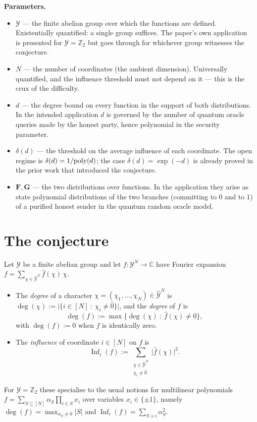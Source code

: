 \documentclass{aicr-conjecture}
\newcommand{\CC}{\mathbb{C}}
\newcommand{\ZZ}{\mathbb{Z}}
\newcommand{\cY}{\mathcal{Y}}
\newcommand{\dY}{\widehat{\mathcal{Y}}}
\newcommand{\bF}{\mathbf{F}}
\newcommand{\bG}{\mathbf{G}}
\begin{document}
\textbf{Parameters.}
\begin{itemize}
  \item $\cY$ --- the finite abelian group over which the functions are
  defined. Existentially quantified: a single group suffices. The paper's
  own application is presented for $\cY=\ZZ_2$ but goes through for
  whichever group witnesses the conjecture.
  \item $N$ --- the number of coordinates (the ambient dimension).
  Universally quantified, and the influence threshold must not depend on
  it --- this is the crux of the difficulty.
  \item $d$ --- the degree bound on every function in the support of both
  distributions. In the intended application $d$ is governed by the
  number of quantum oracle queries made by the honest party, hence
  polynomial in the security parameter.
  \item $\delta(d)$ --- the threshold on the average influence of each
  coordinate. The open regime is $\delta(d)=1/\mathrm{poly}(d)$; the case
  $\delta(d)=\exp(-d)$ is already proved in the prior work that
  introduced the conjecture.
  \item $\bF,\bG$ --- the two distributions over functions. In the
  application they arise as state polynomial distributions of the two
  branches (committing to $0$ and to $1$) of a purified honest sender in
  the quantum random oracle model.
\end{itemize}

\section{The conjecture}\label{sec:conjectures}

\begin{definition}
\label{def:deginf}
Let $\cY$ be a finite abelian group and let $f\colon\cY^N\to\CC$ have
Fourier expansion $f=\sum_{\chi\in\dY^N}\hat{f}(\chi)\,\chi$.
\begin{itemize}
  \item The \emph{degree} of a character
  $\chi=(\chi_1,\dots,\chi_N)\in\dY^N$ is
  $\deg(\chi):=\bigl\lvert\{i\in[N]\ :\ \chi_i\ne\hat{0}\}\bigr\rvert$,
  and the \emph{degree} of $f$ is
  \[ \deg(f):=\max\bigl\{\deg(\chi)\ :\ \hat{f}(\chi)\ne 0\bigr\}, \]
  with $\deg(f):=0$ when $f$ is identically zero.
  \item The \emph{influence} of coordinate $i\in[N]$ on $f$ is
  \[ \operatorname{Inf}_i(f):=
     \sum_{\substack{\chi\in\dY^N\\ \chi_i\ne\hat{0}}}
     \bigl\lvert\hat{f}(\chi)\bigr\rvert^{2}. \]
\end{itemize}
For $\cY=\ZZ_2$ these specialise to the usual notions for multilinear
polynomials $f=\sum_{S\subseteq[N]}\alpha_S\prod_{i\in S}x_i$ over
variables $x_i\in\{\pm 1\}$, namely
$\deg(f)=\max_{\alpha_S\ne 0}\lvert S\rvert$ and
$\operatorname{Inf}_i(f)=\sum_{S\ni i}\alpha_S^{2}$.
\end{definition}
\end{document}
